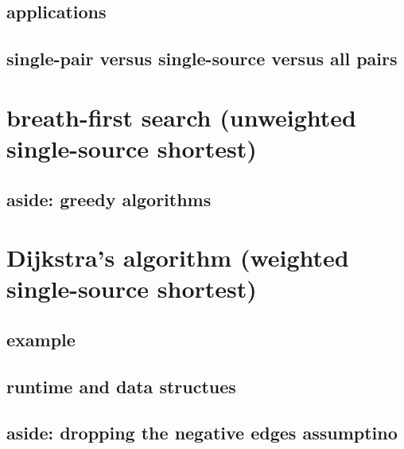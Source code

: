 

\subsection{applications}



\subsection{single-pair versus single-source versus all pairs}



\section{breath-first search (unweighted single-source shortest)}



\subsection{aside: greedy algorithms}




\section{Dijkstra's algorithm (weighted single-source shortest)}




\subsection{example}


\subsection{runtime and data structues}


\subsection{aside: dropping the negative edges assumptino}

